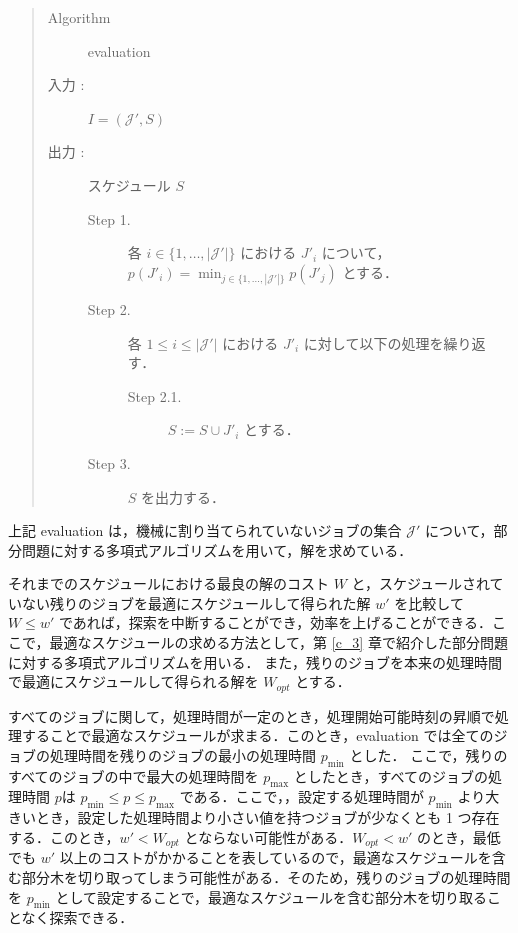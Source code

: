 \documentclass[12pt]{optlab-bachelor}
\begin{document}
\begin{quote}
  \begin{description}
    \item[{\sc Algorithm}] {\sc evaluation}
    \item[入力 :] $I = (\mathcal{J'},S)$
    \item[出力 :] スケジュール $S$
    \begin{description}
      \item[Step 1.] 各 $i \in \{1,\ldots,|\mathcal{J}'|\}$ における $J'_i$ について，\\$p(J'_i) = \displaystyle \min_{j \in \{1,\ldots,|\mathcal{J}'|\}}p(J'_j)$ とする．
      \item[Step 2.] 各 $1 \le i \le |\mathcal{J}'|$ における $J'_i$ に対して以下の処理を繰り返す．
      \begin{description}
        \item[Step 2.1.] $S := S \cup J'_i$ とする．
      \end{description}
      \item[Step 3.] $S$ を出力する．
    \end{description}
  \end{description}
\end{quote}

上記 {\sc evaluation} は，機械に割り当てられていないジョブの集合 $\mathcal{J}'$ について，部分問題に対する多項式アルゴリズムを用いて，解を求めている．

それまでのスケジュールにおける最良の解のコスト $W$ と，スケジュールされていない残りのジョブを最適にスケジュールして得られた解 $w'$ を比較して $W \le w'$ であれば，探索を中断することができ，効率を上げることができる．ここで，最適なスケジュールの求める方法として，第 \ref{c_3} 章で紹介した部分問題に対する多項式アルゴリズムを用いる．
また，残りのジョブを本来の処理時間で最適にスケジュールして得られる解を $W_{opt}$ とする．

すべてのジョブに関して，処理時間が一定のとき，処理開始可能時刻の昇順で処理することで最適なスケジュールが求まる．このとき，{\sc evaluation} では全てのジョブの処理時間を残りのジョブの最小の処理時間 $p_{\min}$ とした．
ここで，残りのすべてのジョブの中で最大の処理時間を $p_{\max}$ としたとき，すべてのジョブの処理時間 $p$は $p_{\min} \le p \le p_{\max}$ である．ここで，，設定する処理時間が $p_{\min}$ より大きいとき，設定した処理時間より小さい値を持つジョブが少なくとも 1 つ存在する．このとき，$w' < W_{opt}$ とならない可能性がある．$W_{opt} < w'$ のとき，最低でも $w'$ 以上のコストがかかることを表しているので，最適なスケジュールを含む部分木を切り取ってしまう可能性がある．そのため，残りのジョブの処理時間を $p_{\min}$ として設定することで，最適なスケジュールを含む部分木を切り取ることなく探索できる．
\end{document}
